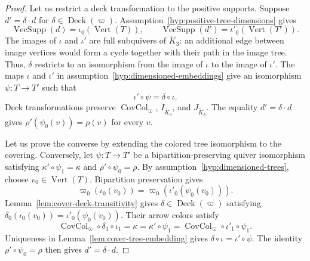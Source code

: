 \begin{proof}
Let us restrict a deck transformation to the positive supports.
Suppose $d'=\delta\cdot d$ for $\delta\in\operatorname{Deck}(\varpi)$.
Assumption~\ref{hyp:positive-tree-dimensions} gives
\[
 \operatorname{VecSupp}(d)=\iota_0(\operatorname{Vert}(T)),\qquad
 \operatorname{VecSupp}(d')=\iota'_0(\operatorname{Vert}(T')).
\]
The images of $\iota$ and $\iota'$ are full subquivers of $\widetilde K_3$: an additional edge between image vertices would form a cycle together with their path in the image tree.
Thus, $\delta$ restricts to an isomorphism from the image of $\iota$ to the image of $\iota'$.
The maps $\iota$ and $\iota'$ in assumption~\ref{hyp:dimensioned-embeddings} give an isomorphism $\psi:T\to T'$ such that
\[
 \iota'\circ\psi=\delta\circ\iota.
\]
Deck transformations preserve $\operatorname{CovCol}_{\varpi}$, $I_{\widetilde K_3}$, and $J_{\widetilde K_3}$.
The equality $d'=\delta\cdot d$ gives $\rho'(\psi_0(v))=\rho(v)$ for every $v$.

Let us prove the converse by extending the colored tree isomorphism to the covering.
Conversely, let $\psi:T\to T'$ be a bipartition-preserving quiver isomorphism satisfying $\kappa'\circ\psi_1=\kappa$ and $\rho'\circ\psi_0=\rho$.
By assumption~\ref{hyp:dimensioned-trees}, choose $v_0\in\operatorname{Vert}(T)$.
Bipartition preservation gives
\[
 \varpi_0(\iota_0(v_0))=\varpi_0(\iota'_0(\psi_0(v_0))).
\]
Lemma~\ref{lem:cover-deck-transitivity} gives $\delta\in\operatorname{Deck}(\varpi)$ satisfying $\delta_0(\iota_0(v_0))=\iota'_0(\psi_0(v_0))$.
Their arrow colors satisfy
\[
 \operatorname{CovCol}_{\varpi}\circ\delta_1\circ\iota_1
 =\kappa=\kappa'\circ\psi_1
 =\operatorname{CovCol}_{\varpi}\circ\iota'_1\circ\psi_1.
\]
Uniqueness in Lemma~\ref{lem:cover-tree-embedding} gives $\delta\circ\iota=\iota'\circ\psi$.
The identity $\rho'\circ\psi_0=\rho$ then gives $d'=\delta\cdot d$.
\end{proof}

